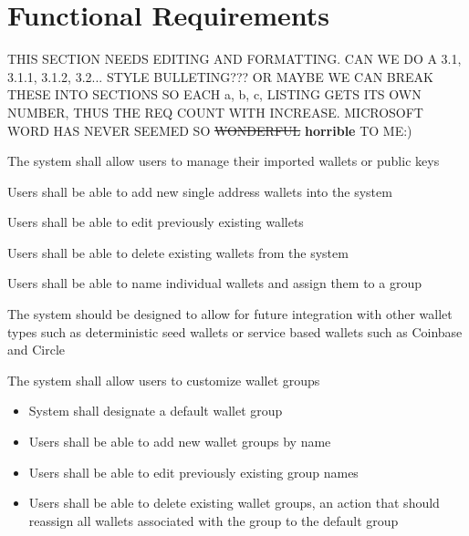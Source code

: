\section{Functional Requirements}
\begin{adjustwidth}{1.5em}{0pt}

  THIS SECTION NEEDS EDITING AND FORMATTING. CAN WE DO A 3.1, 3.1.1, 3.1.2, 3.2... STYLE BULLETING??? OR MAYBE WE CAN BREAK THESE INTO SECTIONS SO EACH a, b, c, LISTING GETS ITS OWN NUMBER, THUS THE REQ COUNT WITH INCREASE. MICROSOFT WORD HAS NEVER SEEMED SO \st{WONDERFUL} \textbf{horrible} TO ME:)\\



  \begin{mainlist}
	
		\item The system shall allow users to manage their imported wallets or public keys
		\begin{sub}
			\item Users shall be able to add new single address wallets into the system
			\item Users shall be able to edit previously existing wallets
			\item Users shall be able to delete existing wallets from the system
			\item Users shall be able to name individual wallets and assign them to a group
			\item The system should be designed to allow for future integration with other wallet types such as deterministic seed wallets or service based wallets such as Coinbase and Circle
		\end{sub}
		
		\item The system shall allow users to customize wallet groups
		\begin{itemize}
			\item System shall designate a default wallet group
			\item Users shall be able to add new wallet groups by name
			\item Users shall be able to edit previously existing group names
			\item Users shall be able to delete existing wallet groups, an action that should reassign all wallets associated with the group to the default group
		\end{itemize}
		

\end{mainlist}
\end{adjustwidth}
